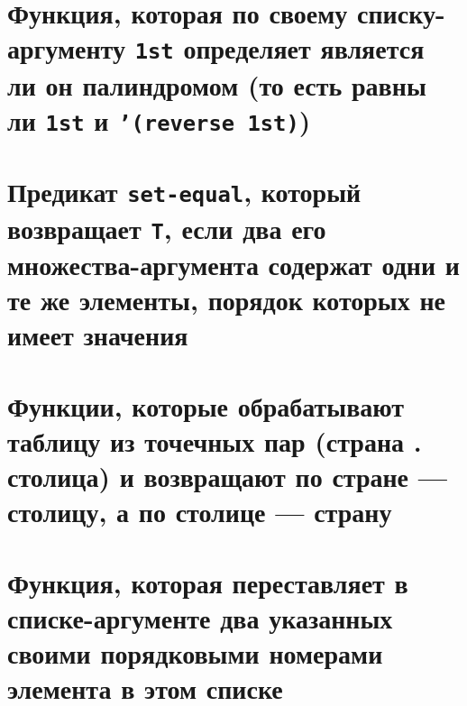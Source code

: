 
\section{Функция, которая по своему списку-аргументу \texttt{1st} определяет является ли он палиндромом (то есть равны ли \texttt{1st} и \texttt{'(reverse 1st)})}



\section{Предикат \texttt{set-equal}, который возвращает \texttt{T}, если два его множества-аргумента содержат одни и те же элементы, порядок которых не имеет значения}



\section{Функции, которые обрабатывают таблицу из точечных пар (страна . столица) и возвращают по стране --- столицу, а по столице --- страну}



\section{Функция, которая переставляет в списке-аргументе два указанных своими порядковыми номерами элемента в этом списке}